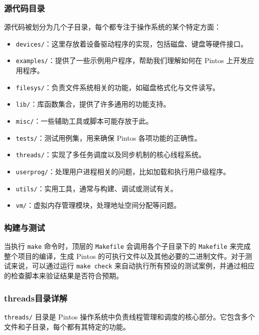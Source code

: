 \documentclass{article}
\begin{document}
\subsubsection{源代码目录}
源代码被划分为几个子目录，每个都专注于操作系统的某个特定方面：
\begin{itemize}
	\item \texttt{devices/}：这里存放着设备驱动程序的实现，包括磁盘、键盘等硬件接口。
	\item \texttt{examples/}：提供了一些示例用户程序，帮助我们理解如何在 Pintos 上开发应用程序。
	\item \texttt{filesys/}：负责文件系统相关的功能，如磁盘格式化与文件读写。
	\item \texttt{lib/}：库函数集合，提供了许多通用的功能支持。
	\item \texttt{misc/}：一些辅助工具或脚本可能存放于此。
	\item \texttt{tests/}：测试用例集，用来确保 Pintos 各项功能的正确性。
	\item \texttt{threads/}：实现了多任务调度以及同步机制的核心线程系统。
	\item \texttt{userprog/}：处理用户进程相关的问题，比如加载和执行用户级程序。
	\item \texttt{utils/}：实用工具，通常与构建、调试或测试有关。
	\item \texttt{vm/}：虚拟内存管理模块，处理地址空间分配等问题。
\end{itemize}

\subsubsection{构建与测试}
当执行 \texttt{make} 命令时，顶层的 \texttt{Makefile} 会调用各个子目录下的 \texttt{Makefile} 来完成整个项目的编译，生成 Pintos 的可执行文件以及其他必要的二进制文件。对于测试来说，可以通过运行 \texttt{make check} 来自动执行所有预设的测试案例，并通过相应的检查脚本来验证结果是否符合预期。

\subsubsection{threads目录详解}
\texttt{threads/} 目录是 Pintos 操作系统中负责线程管理和调度的核心部分。它包含多个文件和子目录，每个都有其特定的功能。
\end{document}
